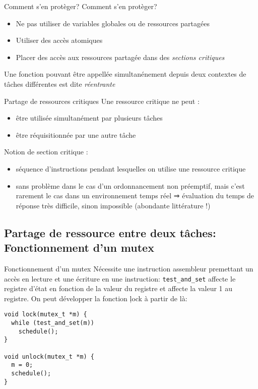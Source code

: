 \begin{frame}{Comment s'en protèger?}
  Comment s'en protèger?
  \begin{itemize} 
  \item  Ne  pas  utiliser  de  variables globales  ou  de  ressources
    partagées
  \item Utiliser des accès atomiques
  \item   Placer  des   accès   aux  ressources   partagée  dans   des
    \emph{sections critiques}
  \end{itemize} 
  Une  fonction  pouvant  être  appellée simultanénement  depuis  deux
  contextes de tâches différentes est dite \emph{réentrante}
\end{frame} 

\begin{frame}{Partage de ressources critiques} 
  Une ressource critique ne peut :
  \begin{itemize}
  \item être utilisée simultanément par plusieurs tâches
  \item être réquisitionnée par une autre tâche
  \end{itemize}
  Notion de section critique :
  \begin{itemize}
  \item  séquence  d'instructions pendant  lesquelles  on utilise  une
    ressource critique 
  \item sans  problème dans le cas d'un  ordonnancement non préemptif,
    mais  c'est rarement  le cas  dans un  environnement temps  réel ⇒
    évaluation du  temps de  réponse très difficile,  sinon impossible
    (abondante littérature !)
  \end{itemize}
\end{frame}

\subsection{Partage de ressource entre deux tâches: Fonctionnement d'un mutex}

\begin{frame}[fragile]{Fonctionnement d'un mutex}
  Nécessite une instruction assembleur  premettant un accès en lecture
  et une écriture  en une instruction: \texttt{test\_and\_set} affecte
  le registre d'état  en fonction de la valeur  du registre et affecte
  la valeur 1  au registre. On peut développer  la fonction \c{lock} à
  partir de là:
\begin{lstlisting} 
void lock(mutex_t *m) {
  while (test_and_set(m))
    schedule();
}

void unlock(mutex_t *m) {
  m = 0;
  schedule();
}
\end{lstlisting} 
\end{frame}

